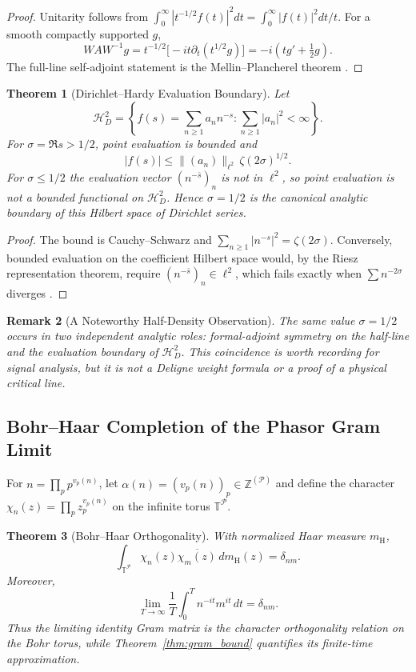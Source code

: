 \documentclass[11pt]{article}
\newtheorem{theorem}{Theorem}[section]
\newtheorem{remark}[theorem]{Remark}
\begin{document}
\begin{proof}
Unitarity follows from
$\int_0^\infty|t^{-1/2}f(t)|^2dt=\int_0^\infty|f(t)|^2dt/t$.
For a smooth compactly supported $g$,
\[
 WAW^{-1}g
 =t^{-1/2}\bigl[-it\partial_t(t^{1/2}g)\bigr]
 =-i(tg'+\tfrac12g).
\]
The full-line self-adjoint statement is the Mellin--Plancherel theorem
\cite{ReedSimon1972}.
\end{proof}

\begin{theorem}[Dirichlet--Hardy Evaluation Boundary]
\label{thm:hardy_boundary}
Let
\[
 \mathcal H^2_D
 =\left\{f(s)=\sum_{n\ge1}a_n n^{-s}:
          \sum_{n\ge1}|a_n|^2<\infty\right\}.
\]
For $\sigma=\Re s>1/2$, point evaluation is bounded and
\[
 |f(s)|\le \|(a_n)\|_{\ell^2}\,\zeta(2\sigma)^{1/2}.
\]
For $\sigma\le1/2$ the evaluation vector $(n^{-\bar s})_n$ is not in
$\ell^2$, so point evaluation is not a bounded functional on
$\mathcal H^2_D$.  Hence $\sigma=1/2$ is the canonical analytic boundary of
this Hilbert space of Dirichlet series.
\end{theorem}

\begin{proof}
The bound is Cauchy--Schwarz and
$\sum_{n\ge1}|n^{-s}|^2=\zeta(2\sigma)$.  Conversely, bounded evaluation on
the coefficient Hilbert space would, by the Riesz representation theorem,
require $(n^{-\bar s})_n\in\ell^2$, which fails exactly when
$\sum n^{-2\sigma}$ diverges \cite{HedenmalmLindqvistSeip1997}.
\end{proof}

\begin{remark}[A Noteworthy Half-Density Observation]
The same value $\sigma=1/2$ occurs in two independent analytic roles:
formal-adjoint symmetry on the half-line and the evaluation boundary of
$\mathcal H^2_D$.  This coincidence is worth recording for signal analysis,
but it is not a Deligne weight formula or a proof of a physical critical line.
\end{remark}

\subsection{Bohr--Haar Completion of the Phasor Gram Limit}

For $n=\prod_p p^{v_p(n)}$, let
$\alpha(n)=(v_p(n))_p\in\mathbb Z^{(\mathcal P)}$ and define the character
$\chi_n(z)=\prod_p z_p^{v_p(n)}$ on the infinite torus
$\mathbb T^{\mathcal P}$.

\begin{theorem}[Bohr--Haar Orthogonality]
\label{prop:bohr_haar}
With normalized Haar measure $m_{\mathrm H}$,
\[
 \int_{\mathbb T^{\mathcal P}}\chi_n(z)\overline{\chi_m(z)}\,dm_{\mathrm H}(z)
 =\delta_{nm}.
\]
Moreover,
\[
 \lim_{T\to\infty}\frac1T\int_0^T n^{-it}m^{it}\,dt=\delta_{nm}.
\]
Thus the limiting identity Gram matrix is the character orthogonality relation
on the Bohr torus, while Theorem~\ref{thm:gram_bound} quantifies its finite-time
approximation.
\end{theorem}
\end{document}
